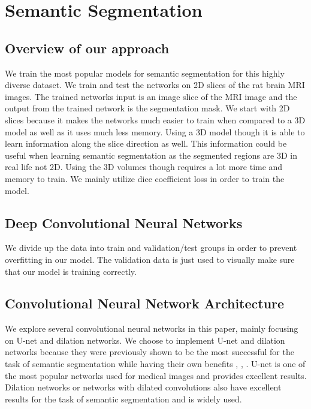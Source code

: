 \chapter{Semantic Segmentation}
%



\section{Overview of our approach}
We train the most popular models for semantic segmentation for this highly diverse dataset. 
We train and test the networks on 2D slices of the rat brain MRI images. 
The trained networks input is an image slice of the MRI image and the output from the trained network is the segmentation mask. 
We start with 2D slices because it makes the networks much easier to train when compared to a 3D model as well as it uses much less memory. 
Using a 3D model though it is able to learn information along the slice direction as well. 
This information could be useful when learning semantic segmentation as the segmented regions are 3D in real life not 2D. 
Using the 3D volumes though requires a lot more time and memory to train. 
We mainly utilize dice coefficient loss in order to train the model.

\section{Deep Convolutional Neural Networks}
    We divide up the data into train and validation/test groups in order to prevent overfitting in our model. 
    The validation data is just used to visually make sure that our model is training correctly.  

\section{Convolutional Neural Network Architecture}
    We explore several convolutional neural networks in this paper, mainly focusing on U-net and dilation networks. 
    We choose to implement U-net and dilation networks because they were previously shown to be the most successful for the task of semantic segmentation while having their own benefits \cite{DBLP:journals/corr/LongSD14}, \cite{DBLP:journals/corr/RonnebergerFB15}, \cite{Yu2016MultiScaleCA}. 
    U-net is one of the most popular networks used for medical images and provides excellent results. 
    Dilation networks or networks with dilated convolutions also have excellent results for the task of semantic segmentation and is widely used. 

